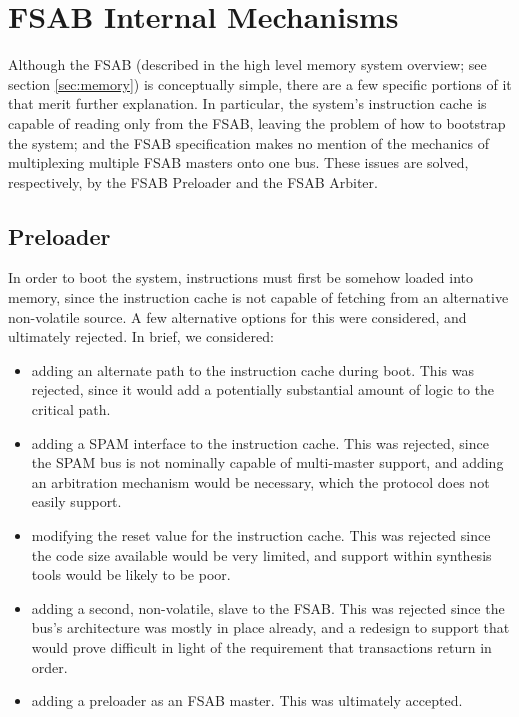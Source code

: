 \documentclass[10pt]{article}
\begin{document}
\section{FSAB Internal Mechanisms}
\label{sec:fsabinternal}

Although the FSAB (described in the high level memory system overview; see
section \ref{sec:memory}) is conceptually simple, there are a few specific
portions of it that merit further explanation.  In particular, the system's
instruction cache is capable of reading only from the FSAB, leaving the
problem of how to bootstrap the system; and the FSAB specification makes no
mention of the mechanics of multiplexing multiple FSAB masters onto one bus. 
These issues are solved, respectively, by the FSAB Preloader and the FSAB
Arbiter.

\subsection{Preloader}
\label{sec:preloader}

In order to boot the system, instructions must first be somehow loaded into
memory, since the instruction cache is not capable of fetching from an
alternative non-volatile source. A few alternative options for this were
considered, and ultimately rejected. In brief, we considered:

\begin{itemize}
\item{adding an alternate path to the instruction cache during boot. This
was rejected, since it would add a potentially substantial amount of logic
to the critical path.}
\item{adding a SPAM interface to the instruction cache. This was rejected,
since the SPAM bus is not nominally capable of multi-master support, and
adding an arbitration mechanism would be necessary, which the protocol does
not easily support.}
\item{modifying the reset value for the instruction cache. This was rejected
since the code size available would be very limited, and support within
synthesis tools would be likely to be poor.}
\item{adding a second, non-volatile, slave to the FSAB. This was rejected
since the bus's architecture was mostly in place already, and a redesign to
support that would prove difficult in light of the requirement that
transactions return in order.}
\item{adding a preloader as an FSAB master. This was ultimately accepted.}
\end{itemize}
\end{document}
